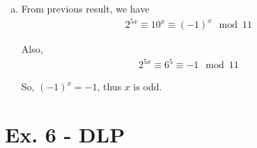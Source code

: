 \documentclass[a4paper,12pt]{journal}
\begin{document}
\begin{enumerate}
\begin{enumerate}[a)]
				\item From previous result, we have
				\begin{align*}
					2^{5x} \equiv 10^{x} \equiv (-1)^{x} \mod 11
				\end{align*}
				\par Also,
				\begin{align*}
					2^{5x} \equiv 6^{5} \equiv -1 \mod 11
				\end{align*}
				\par So, $(-1)^{x} = -1$, thus $x$ is odd.
			\end{enumerate}
		\end{enumerate}
		
		
		
		\section*{Ex. 6 - DLP}
\end{document}
